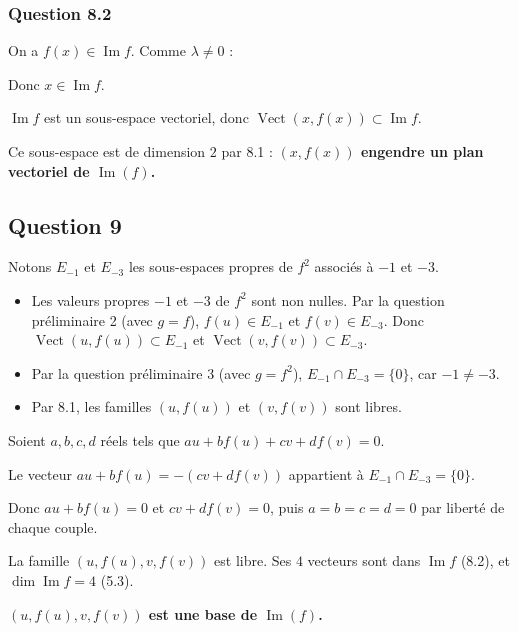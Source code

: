 \documentclass[11pt,a4paper]{article}
\providecommand{\tightlist}{\setlength{\itemsep}{0pt}\setlength{\parskip}{0pt}}
\newcommand{\equationajustee}[1]{%
  \sbox{\boiteequation}{$\displaystyle #1$}%
  \ifdim\wd\boiteequation>\linewidth
    \[\resizebox{\linewidth}{!}{\usebox{\boiteequation}}\]%
  \else
    \[#1\]%
  \fi}
\begin{document}
\hypertarget{question-8.2}{%
\subsubsection{Question 8.2}\label{question-8.2}}

On a \(f(x)\in\operatorname{Im}f\). Comme \(\lambda\neq0\) :

\equationajustee{x=\frac1\lambda f^2(x)=f\!\left(\frac1\lambda f(x)\right).}

Donc \(x\in\operatorname{Im}f\).

\(\operatorname{Im}f\) est un sous-espace vectoriel, donc \(\operatorname{Vect}(x,f(x))\subset\operatorname{Im}f\).

Ce sous-espace est de dimension \(2\) par 8.1 : \textbf{\((x,f(x))\) engendre un plan vectoriel de \(\operatorname{Im}(f)\).}

\hypertarget{question-9}{%
\subsection{Question 9}\label{question-9}}

Notons \(E_{-1}\) et \(E_{-3}\) les sous-espaces propres de \(f^2\) associés à \(-1\) et \(-3\).

\begin{itemize}
\tightlist
\item
  Les valeurs propres \(-1\) et \(-3\) de \(f^2\) sont non nulles. Par la question préliminaire 2 (avec \(g=f\)), \(f(u)\in E_{-1}\) et \(f(v)\in E_{-3}\).
  Donc \(\operatorname{Vect}(u,f(u))\subset E_{-1}\) et \(\operatorname{Vect}(v,f(v))\subset E_{-3}\).
\item
  Par la question préliminaire 3 (avec \(g=f^2\)), \(E_{-1}\cap E_{-3}=\{0\}\), car \(-1\neq-3\).
\item
  Par 8.1, les familles \((u,f(u))\) et \((v,f(v))\) sont libres.
\end{itemize}

Soient \(a,b,c,d\) réels tels que \(au+bf(u)+cv+df(v)=0\).

Le vecteur \(au+bf(u)=-(cv+df(v))\) appartient à \(E_{-1}\cap E_{-3}=\{0\}\).

Donc \(au+bf(u)=0\) et \(cv+df(v)=0\), puis \(a=b=c=d=0\) par liberté de chaque couple.

La famille \((u,f(u),v,f(v))\) est libre. Ses \(4\) vecteurs sont dans \(\operatorname{Im}f\) (8.2), et \(\dim\operatorname{Im}f=4\) (5.3).

\textbf{\((u,f(u),v,f(v))\) est une base de \(\operatorname{Im}(f)\).}
\end{document}
